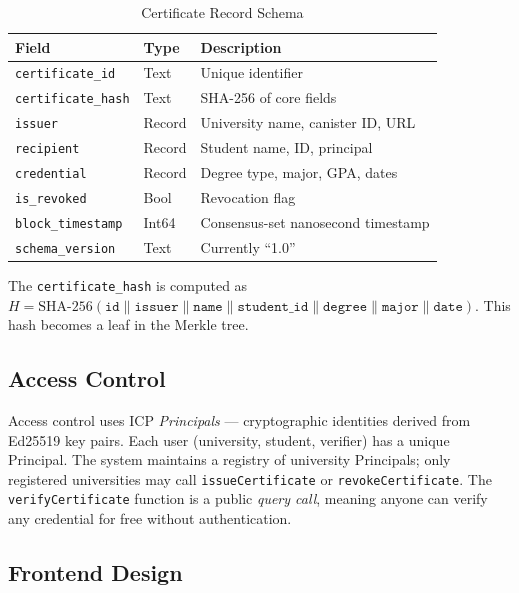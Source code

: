 \documentclass[journal]{IEEEtran}
\begin{document}
\begin{table}[h]
\caption{Certificate Record Schema}
\label{tab:schema}
\centering\small\renewcommand{\arraystretch}{1.1}
\begin{tabular}{@{}lll@{}}
\toprule
\textbf{Field} & \textbf{Type} & \textbf{Description} \\
\midrule
\texttt{certificate\_id}    & Text   & Unique identifier \\
\texttt{certificate\_hash}  & Text   & SHA-256 of core fields \\
\texttt{issuer}             & Record & University name, canister ID, URL \\
\texttt{recipient}          & Record & Student name, ID, principal \\
\texttt{credential}         & Record & Degree type, major, GPA, dates \\
\texttt{is\_revoked}        & Bool   & Revocation flag \\
\texttt{block\_timestamp}   & Int64  & Consensus-set nanosecond timestamp \\
\texttt{schema\_version}    & Text   & Currently ``1.0'' \\
\bottomrule
\end{tabular}
\end{table}

The \texttt{certificate\_hash} is computed as $H = \text{SHA-256}(\texttt{id} \| \texttt{issuer} \| \texttt{name} \| \texttt{student\_id} \| \texttt{degree} \| \texttt{major} \| \texttt{date})$. This hash becomes a leaf in the Merkle tree.

\subsection{Access Control}

Access control uses ICP \emph{Principals} — cryptographic identities derived from Ed25519 key pairs. Each user (university, student, verifier) has a unique Principal. The system maintains a registry of university Principals; only registered universities may call \texttt{issueCertificate} or \texttt{revokeCertificate}. The \texttt{verifyCertificate} function is a public \emph{query call}, meaning anyone can verify any credential for free without authentication.

\subsection{Frontend Design}
\end{document}
